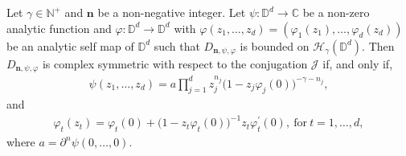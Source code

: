 \documentclass[10pt,a4paper]{amsart}
\newcommand{\mfn}{\mathbf n}
\begin{document}
\begin{theorem}\label{Thm_1}
Let $\gamma\in \mathbb{N}^+$ and $\mfn$ be a non-negative integer. Let $\psi: \mathbb{D}^d\longrightarrow \mathbb{C}$ be a non-zero analytic function and $\varphi: \mathbb{D}^d\longrightarrow \mathbb{D}^d$ with $\varphi(z_1,  \dots, z_d)=(\varphi_1(z_1), \dots, \varphi_d(z_d))$ be an analytic self map of $\mathbb{D}^d$ such that $D_{\mfn,\psi,\varphi}$ is bounded on $\mathcal{H}_\gamma(\mathbb{D}^d)$.
    Then $D_{\mfn,\psi,\varphi}$ is complex symmetric with respect to the conjugation $\mathcal{J}$ if, and only if,
\begin{gather*}
    \psi(z_1, \dots, z_d)=a\prod_{j=1}^dz_j^{n_j}\big(1-z_j\varphi_j(0)\big)^{-\gamma-n_j},
\end{gather*}
and 
\begin{gather*}
        \varphi_t(z_t)=\varphi_t(0)+\big(1-z_t\varphi_t(0)\big)^{-1}z_t\varphi_t^{\prime}(0),~ \mbox{for}~ t=1, \dots, d,
\end{gather*}
where $a=\partial^n\psi(0, \dots, 0)$.
\end{theorem}
\end{document}
